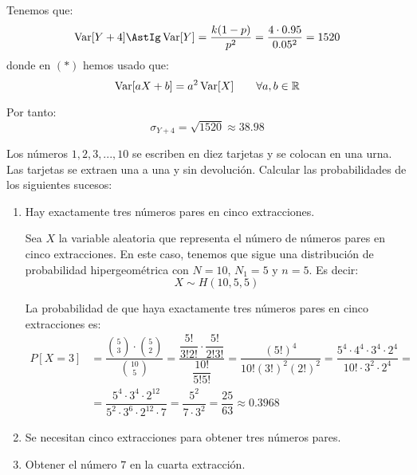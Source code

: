 \begin{ejercicio}
\begin{enumerate}
        Tenemos que:
        \begin{equation*}
            \Var[Y+4] \AstIg \Var[Y]= \dfrac{k(1-p)}{p^2} = \dfrac{4\cdot 0.95}{0.05^2} = 1520
        \end{equation*}
        donde en $(\ast)$ hemos usado que:
        \begin{equation*}
            \operatorname{Var}[aX+b] = a^2\operatorname{Var}[X] \qquad \forall a,b\in \mathbb{R}
        \end{equation*}

        Por tanto:
        \begin{equation*}
            \sigma_{Y+4} = \sqrt{1520} \approx 38.98
        \end{equation*}
    \end{enumerate}
\end{ejercicio}


\begin{ejercicio}
    Los números $1,2,3,...,10$ se escriben en diez tarjetas y se colocan en una urna. Las tarjetas se
    extraen una a una y sin devolución. Calcular las probabilidades de los siguientes sucesos:
    \begin{enumerate}
        \item Hay exactamente tres números pares en cinco extracciones.
        
        Sea $X$ la variable aleatoria que representa el número de números pares en cinco extracciones. En este caso, tenemos que sigue una distribución de probabilidad hipergeométrica con $N=10$, $N_1=5$ y $n=5$. Es decir:
        \begin{equation*}
            X \sim H(10,5,5)
        \end{equation*}

        La probabilidad de que haya exactamente tres números pares en cinco extracciones es:
        \begin{align*}
            P[X=3] &= \dfrac{\binom{5}{3} \cdot \binom{5}{2}}{\binom{10}{5}} = \dfrac{\dfrac{5!}{3!2!} \cdot \dfrac{5!}{2!3!}}{\dfrac{10!}{5!5!}} = \dfrac{(5!)^4}{10!(3!)^2(2!)^2} = \dfrac{5^4\cdot 4^4 \cdot 3^4 \cdot 2^4}{10!\cdot 3^2\cdot 2^4} =\\
            &= \dfrac{5^4\cdot 3^4 \cdot 2^{12}}{5^2\cdot 3^6\cdot 2^{12}\cdot 7} = \dfrac{5^2}{7\cdot 3^2} = \dfrac{25}{63} \approx 0.3968
        \end{align*}
        \item Se necesitan cinco extracciones para obtener tres números pares.
        
        \item Obtener el número $7$ en la cuarta extracción.
    \end{enumerate}



\end{ejercicio}

